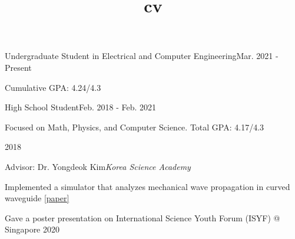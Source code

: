 \documentclass{cv}
\title{cv}
\begin{document}
\cvheader






{Undergraduate Student in Electrical and Computer Engineering}{Mar. 2021 - Present}
{
    \item Cumulative GPA: 4.24/4.3
}
{High School Student}{Feb. 2018 - Feb. 2021}
{
    \item Focused on Math, Physics, and Computer Science. Total GPA: 4.17/4.3
}

\begin{comment}

\cvsection{Publications}

\cvpublication{A. B. Lee, C. D. Park, E.-F. Kang, \textbf{S. Lee}, G. Kim, and G.-D. Hong*}{Lorem ipsum dolor sit amet, consectetur adipiscing elit, sed do eiusmod tempor}{Appl. Phys. A}{\textbf{102}, 1027}{2016}

\cvpublication{A. Jo, B.-C. Yang,B. Kim, D.-E. Lim, and G.-D. Hong*}{Nisl tincidunt eget nullam non Quis hendrerit dolor magna eget est lorem ipsum dolor sit}{Solar Energy}{\textbf{107}, 940}{2016}

\end{comment}


 {2018}

\vspace{-4mm}

{Advisor: Dr. Yongdeok Kim}{\textit{Korea Science Academy}}
{
    \item Implemented a simulator that analyzes mechanical wave propagation in curved waveguide \href{https://research.ksa.hs.kr/2019RNE_MAT02}{[paper]}
    \item Gave a poster presentation on International Science Youth Forum (ISYF) @ Singapore 2020
}
\end{document}
